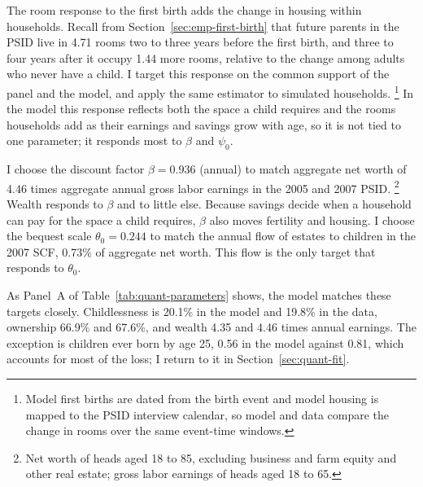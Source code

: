 The room response to the first birth adds the change in housing within
households. Recall from Section~\ref{sec:emp-first-birth} that future parents
in the PSID live in 4.71 rooms two to three years before the first birth,
and three to four years after it occupy 1.44 more rooms, relative to the
change among adults who never have a child. I target this response on the
common support of the panel and the model, and apply the same estimator to
simulated households.%
\footnote{Model first births are dated from the birth event and model
housing is mapped to the PSID interview calendar, so model and data compare
the change in rooms over the same event-time windows.}
In the model this response reflects both the space a child requires and the
rooms households add as their earnings and savings grow with age, so it is
not tied to one parameter; it responds most to $\beta$ and $\psi_0$.

I choose the discount factor $\beta=0.936$ (annual) to match aggregate net
worth of 4.46 times aggregate annual gross labor earnings in the 2005 and
2007 PSID.%
\footnote{Net worth of heads aged 18 to 85, excluding business and farm
equity and other real estate; gross labor earnings of heads aged 18 to 65.}
Wealth responds to $\beta$ and to little else. Because savings decide when a
household can pay for the space a child requires, $\beta$ also moves
fertility and housing. I choose the bequest scale $\theta_0=0.244$ to match
the annual flow of estates to children in the 2007 SCF, 0.73\% of aggregate
net worth. This flow is the only target that responds to $\theta_0$.

As Panel~A of Table~\ref{tab:quant-parameters} shows, the model matches
these targets closely. Childlessness is 20.1\% in the model and 19.8\% in
the data, ownership 66.9\% and 67.6\%, and wealth 4.35 and 4.46 times annual
earnings. The exception is children ever born by age 25, 0.56 in the model
against 0.81, which accounts for most of the loss; I return to it in
Section~\ref{sec:quant-fit}.

